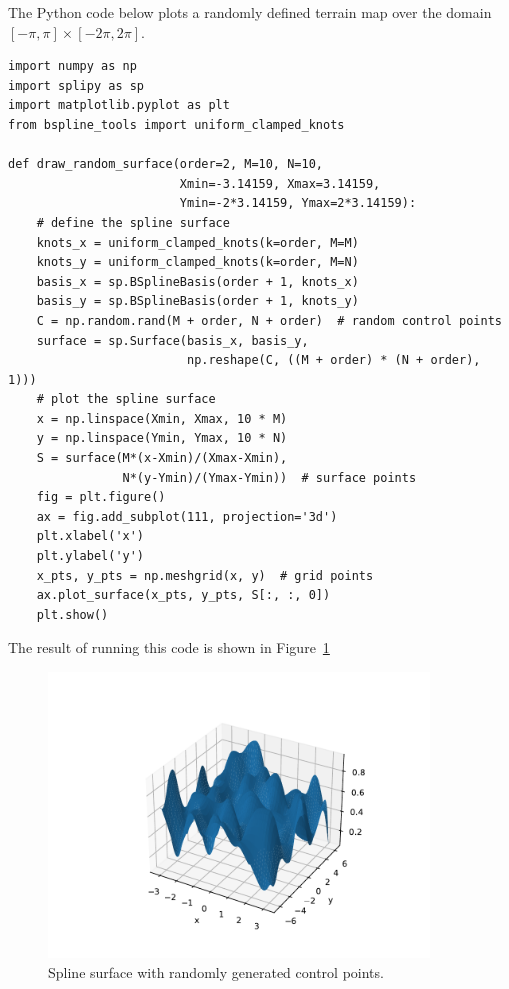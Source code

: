 The Python code below plots a randomly defined terrain map over the domain $[-\pi, \pi]\times[-2\pi, 2\pi]$.
\begin{lstlisting}
import numpy as np
import splipy as sp
import matplotlib.pyplot as plt
from bspline_tools import uniform_clamped_knots

def draw_random_surface(order=2, M=10, N=10,
                        Xmin=-3.14159, Xmax=3.14159,
                        Ymin=-2*3.14159, Ymax=2*3.14159):
    # define the spline surface
    knots_x = uniform_clamped_knots(k=order, M=M)
    knots_y = uniform_clamped_knots(k=order, M=N)
    basis_x = sp.BSplineBasis(order + 1, knots_x)
    basis_y = sp.BSplineBasis(order + 1, knots_y)
    C = np.random.rand(M + order, N + order)  # random control points
    surface = sp.Surface(basis_x, basis_y,
                         np.reshape(C, ((M + order) * (N + order), 1)))
    # plot the spline surface
    x = np.linspace(Xmin, Xmax, 10 * M)
    y = np.linspace(Ymin, Ymax, 10 * N)
    S = surface(M*(x-Xmin)/(Xmax-Xmin),
                N*(y-Ymin)/(Ymax-Ymin))  # surface points
    fig = plt.figure()
    ax = fig.add_subplot(111, projection='3d')
    plt.xlabel('x')
    plt.ylabel('y')
    x_pts, y_pts = np.meshgrid(x, y)  # grid points
    ax.plot_surface(x_pts, y_pts, S[:, :, 0])
    plt.show()
\end{lstlisting}
The result of running this code is shown in Figure~\ref{fig:random_spline_surface}
\begin{figure}[hbt]
  \centering\includegraphics[width=0.9\textwidth]{./chap5_trajectory_planning/figures/random_spline_surface}
  \caption{Spline surface with randomly generated control points.}
  \label{fig:random_spline_surface}  
\end{figure}





